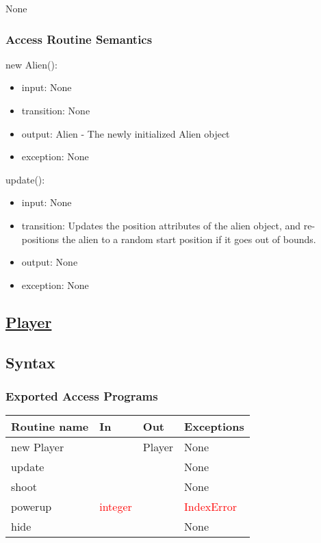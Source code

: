 \documentclass[12pt, titlepage]{article}
\begin{document}
None

\subsubsection* {Access Routine Semantics}

\noindent new Alien():
\begin{itemize}
\item input: None
\item transition: None
\item output: Alien - The newly initialized Alien object
\item exception: None
\end{itemize}

\noindent update():
\begin{itemize}
\item input: None
\item transition: Updates the position attributes of the alien object, and re-positions the alien to a random start position if it goes out of bounds. 
\item output: None
\item exception: None
\end{itemize}

\subsection* {\underline{Player}} 
\subsection* {Syntax}

\subsubsection* {Exported Access Programs}

\begin{tabular}{| l | l | l | p{5cm} |}
\hline
\textbf{Routine name} & \textbf{In} & \textbf{Out} & \textbf{Exceptions}\\
\hline
new Player & & Player & None\\
\hline
update & & & None\\
\hline
shoot & & & None\\
\hline
powerup & \textcolor{red}{integer} & & \textcolor{red}{IndexError}\\
\hline
hide & & & None\\
\hline
\end{tabular}
\end{document}
